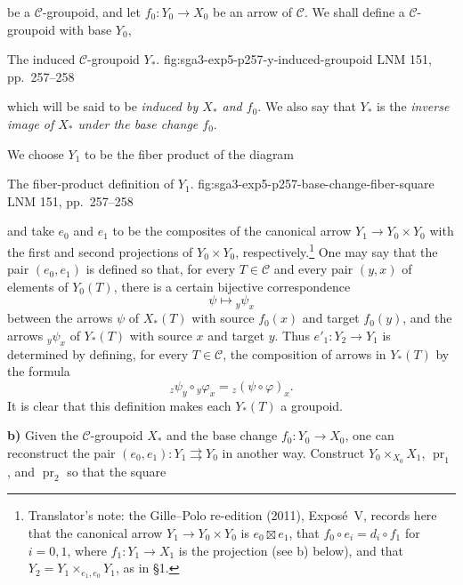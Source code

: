 \noindent be a \(\mathscr C\)-groupoid, and let \(f_0:Y_0\to X_0\) be
an arrow of \(\mathscr C\). We shall define a \(\mathscr C\)-groupoid
with base \(Y_0\),

  {The induced \(\mathscr C\)-groupoid \(Y_\ast\).}
  {fig:sga3-exp5-p257-y-induced-groupoid}
  {LNM 151, pp.~257--258}

\noindent which will be said to be \emph{induced by \(X_\ast\) and
\(f_0\)}. We also say that \(Y_\ast\) is the \emph{inverse image of
\(X_\ast\) under the base change \(f_0\)}.

We choose \(Y_1\) to be the fiber product of the diagram

  {The fiber-product definition of \(Y_1\).}
  {fig:sga3-exp5-p257-base-change-fiber-square}
  {LNM 151, pp.~257--258}

\noindent and take \(e_0\) and \(e_1\) to be the composites of the
canonical arrow \(Y_1\to Y_0\times Y_0\) with the first and second
projections of \(Y_0\times Y_0\), respectively.\footnote{Translator's note: the Gille--Polo re-edition (2011), Exposé~V, records
here that the canonical arrow \(Y_1\to Y_0\times Y_0\) is \(e_0\boxtimes e_1\),
that \(f_0\circ e_i=d_i\circ f_1\) for \(i=0,1\), where \(f_1\colon Y_1\to X_1\)
is the projection (see b) below), and that
\(Y_2=Y_1\times_{e_1,e_0}Y_1\), as in \S1.}
One may say that the pair \((e_0,e_1)\)
is defined so that, for every \(T\in\mathscr C\) and every pair \((y,x)\)
of elements of \(Y_0(T)\), there is a certain bijective correspondence
\[
  \psi\longmapsto{}_{y}\psi_{x}
\]
between the arrows \(\psi\) of \(X_\ast(T)\) with source \(f_0(x)\) and
target \(f_0(y)\), and the arrows \({}_{y}\psi_x\) of \(Y_\ast(T)\)
with source \(x\) and target \(y\). Thus \(e'_1:Y_2\to Y_1\) is
determined by defining, for every \(T\in\mathscr C\), the composition
of arrows in \(Y_\ast(T)\) by the formula
\[
  {}_{z}\psi_y\circ{}_{y}\varphi_x
  ={}_{z}(\psi\circ\varphi)_x.
\]
It is clear that this definition makes each \(Y_\ast(T)\) a groupoid.

\medskip
{}\label{par:sga3-V-3-b}%
\noindent\textbf{b)} Given the \(\mathscr C\)-groupoid \(X_\ast\) and
the base change \(f_0:Y_0\to X_0\), one can reconstruct the pair
\((e_0,e_1):Y_1\rightrightarrows Y_0\) in another way.
Construct \(Y_0\times_{X_0}X_1\), \(\operatorname{pr}_1\), and
\(\operatorname{pr}_2\) so that the square

